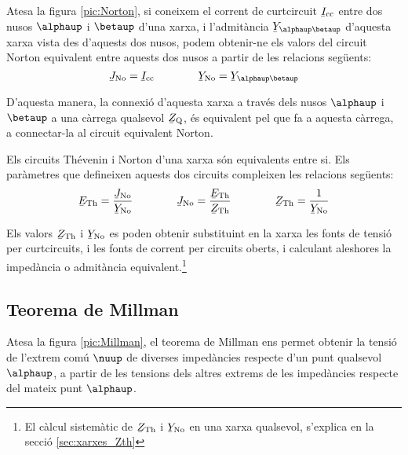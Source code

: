 Atesa la figura \vref{pic:Norton}, si coneixem el corrent de
curtcircuit $\cmplx{I}\ped{cc}$ entre dos nusos $\alphaup$ i $\betaup$
d'una xarxa, i l'admitància $\cmplx{Y}_{\alphaup\betaup}$ d'aquesta
xarxa vista des d'aquests dos nusos, podem obtenir-ne els valors del
circuit Norton equivalent entre aquests dos nusos a partir de les
relacions següents:
\begin{equation}
   \cmplx{J}\ped{No} = \cmplx{I}\ped{cc} \qquad\qquad \cmplx{Y}\ped{No} = \cmplx{Y}_{\alphaup\betaup}
\end{equation}

D'aquesta manera, la connexió d'aquesta xarxa a través dels nusos
$\alphaup$ i $\betaup$ a una càrrega qualsevol $\cmplx{Z}\ped{Q}$, és
equivalent pel que fa a aquesta càrrega, a connectar-la al circuit
equivalent Norton.
\begin{center}
    
    \label{pic:Norton}
\end{center}

Els circuits Thévenin i Norton d'una xarxa són equivalents entre si.
Els paràmetres que defineixen aquests dos circuits compleixen les relacions
següents:
\begin{equation}\label{eq:Thevenin-Norton}
   \cmplx{E}\ped{Th} = \frac{\cmplx{J}\ped{No}}{\cmplx{Y}\ped{No}} \qquad\qquad
   \cmplx{J}\ped{No} = \frac{\cmplx{E}\ped{Th}}{\cmplx{Z}\ped{Th}} \qquad\qquad
    \cmplx{Z}\ped{Th} = \frac{1}{\cmplx{Y}\ped{No}}
\end{equation}

Els valors $\cmplx{Z}\ped{Th}$ i  $\cmplx{Y}\ped{No}$ es poden
obtenir substituint en la xarxa  les fonts de tensió  per curtcircuits, i les fonts de corrent per circuits oberts, i calculant
aleshores la impedància o admitància equivalent.\footnote{El càlcul sistemàtic de $\cmplx{Z}\ped{Th}$ i  $\cmplx{Y}\ped{No}$ en una xarxa qualsevol, s'explica en la secció \ref{sec:xarxes_Zth}}

\subsection{Teorema de Millman}\label{sec:millman}

Atesa la figura \vref{pic:Millman}, el teorema
de Millman ens permet
obtenir la tensió de l'extrem comú $\nuup$ de diverses impedàncies respecte d'un punt
qualsevol $\alphaup$, a partir de les tensions dels altres extrems de les impedàncies respecte  del mateix punt $\alphaup$.


